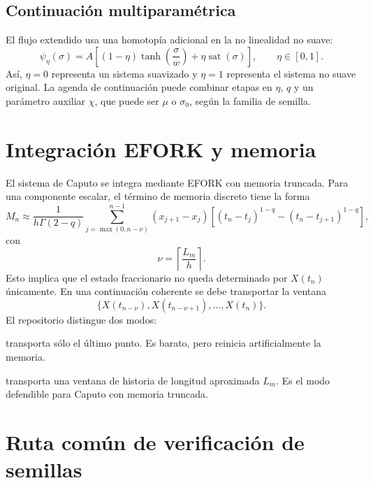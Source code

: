 \documentclass[11pt]{article}
\newcommand{\sat}{\operatorname{sat}}
\begin{document}
\subsection{Continuación multiparamétrica}

El flujo extendido usa una homotopía adicional en la no linealidad no suave:
\begin{equation}
\psi_\eta(\sigma)=A\left[(1-\eta)\tanh\left(\frac{\sigma}{w}\right)+\eta\sat(\sigma)\right],
\qquad
\eta\in[0,1].
\label{eq:eta_homotopy}
\end{equation}
Así, \(\eta=0\) representa un sistema suavizado y \(\eta=1\) representa el sistema no suave original. La agenda de continuación puede combinar etapas en \(\eta\), \(q\) y un parámetro auxiliar \(\chi\), que puede ser \(\mu\) o \(\sigma_0\), según la familia de semilla.

\section{Integración EFORK y memoria}

El sistema de Caputo se integra mediante EFORK con memoria truncada. Para una componente escalar, el término de memoria discreto tiene la forma
\begin{equation}
M_n\approx
\frac{1}{h\Gamma(2-q)}
\sum_{j=\max(0,n-\nu)}^{n-1}
(x_{j+1}-x_j)
\left[(t_n-t_j)^{1-q}-(t_n-t_{j+1})^{1-q}\right],
\label{eq:memory_term}
\end{equation}
con
\begin{equation}
\nu=\left\lceil\frac{L_m}{h}\right\rceil.
\end{equation}
Esto implica que el estado fraccionario no queda determinado por \(X(t_n)\) únicamente. En una continuación coherente se debe transportar la ventana
\begin{equation}
\{X(t_{n-\nu}),X(t_{n-\nu+1}),\ldots,X(t_n)\}.
\label{eq:memory_window}
\end{equation}
El repositorio distingue dos modos:
\begin{description}[leftmargin=3.2cm]
\item[\texttt{point}] transporta sólo el último punto. Es barato, pero reinicia artificialmente la memoria.
\item[\texttt{window}] transporta una ventana de historia de longitud aproximada \(L_m\). Es el modo defendible para Caputo con memoria truncada.
\end{description}

\section{Ruta común de verificación de semillas}
\end{document}

